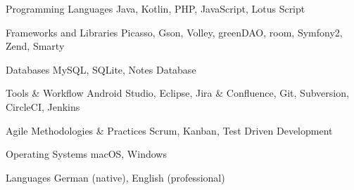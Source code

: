

\begin{cvskills}

  \cvskill
    {Programming Languages} %
    {Java, Kotlin, PHP, JavaScript, Lotus Script} %
  
  \cvskill
    {Frameworks and Libraries} %
    {Picasso, Gson, Volley, greenDAO, room, Symfony2, Zend, Smarty} %
  
  \cvskill
    {Databases} %
    {MySQL, SQLite, Notes Database} %

  \cvskill
    {Tools \& Workflow} %
    {Android Studio, Eclipse, Jira \& Confluence, Git, Subversion, CircleCI, Jenkins} %

  \cvskill
    {Agile Methodologies \& Practices} %
    {Scrum, Kanban, Test Driven Development} %

  \cvskill
    {Operating Systems} %
    {macOS, Windows} %

  \cvskill
    {Languages} %
    {German (native), English (professional)} %

\end{cvskills}
